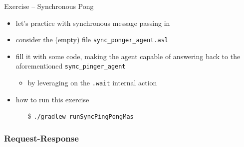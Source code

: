 \documentclass[presentation]{beamer}\mode<presentation>{\usetheme{AMSBolognaFC}}
\begin{document}

\begin{frame}[c, allowframebreaks]{Exercise \theJasonExample{} -- Synchronous Pong}
    \begin{itemize}
        \item let's practice with synchronous message passing in \jason{}
        
        \vspace{.3cm}
        
        \item consider the (empty) file \texttt{sync\_ponger\_agent.asl}
        
        \vspace{.3cm}
        
        \item fill it with some \jason{} code, making the agent capable of answering back to the aforementioned \texttt{sync\_pinger\_agent}
        \begin{itemize}
            \item by leveraging on the \texttt{.wait} internal action
        \end{itemize}
        
        \vspace{.3cm}
        
        \item how to run this exercise
        \begin{itemize}
            \item[\$] \texttt{./gradlew run\alert{SyncPingPong}Mas}
        \end{itemize}
        
    \end{itemize}
\end{frame}

\subsubsection{Request-Response}
\end{document}
